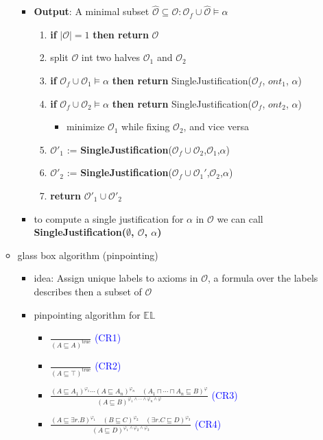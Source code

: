 \documentclass[12pt,a4paper]{article}
\newcommand{\blue}[1]{\textcolor{blue} {#1}}
\newcommand{\ont}{\mathcal{O}}
\newcommand{\sse}{\sqsubseteq}
\newcommand{\sand}{\sqcap}
\begin{document}
\begin{itemize}
\begin{itemize}
\begin{itemize}
\item \textbf{Output}: A minimal subset $\hat{\ont} \subseteq \ont: \ont_f \cup \hat{\ont}\models\alpha$
\begin{enumerate}
\item \textbf{if} $\vert\ont\vert = 1$ \textbf{then return} $\ont$
\item split $\ont$ int two halves $\ont_1$ and $\ont_2$
\item \textbf{if} $\ont_f \cup \ont_1 \models\alpha$ \textbf{then return} SingleJustification($\ont_f$, $ont_1$, $\alpha$)
\item \textbf{if} $\ont_f \cup \ont_2 \models\alpha$ \textbf{then return} SingleJustification($\ont_f$, $ont_2$, $\alpha$)
\begin{itemize}
\item minimize $\ont_1$ while fixing $\ont_2$, and vice versa
\end{itemize}
\item $\ont'_1$ := \textbf{SingleJustification}($\ont_f\cup\ont_2$,$\ont_1$,$\alpha$)
\item $\ont'_2$ := \textbf{SingleJustification}($\ont_f\cup\ont_1'$,$\ont_2$,$\alpha$)
\item \textbf{return} $\ont'_1 \cup \ont'_2$
\end{enumerate}
\item to compute a single justification for $\alpha$ in $\ont$ we can call \textbf{SingleJustification($\emptyset$, $\ont$, $\alpha$)}
\end{itemize}
\item glass box algorithm (pinpointing)
\begin{itemize}
\item idea: Assign unique labels to axioms in $\ont$, a formula over the labels describes then a subset of $\ont$
\item pinpointing algorithm for $\mathbb{EL}$
\begin{itemize}
\item $\displaystyle \frac{}{(A\sse A)^\text{true}}$ \blue{(CR1)}
\item $\displaystyle \frac{}{(A\sse \top)^\text{true}}$ \blue{(CR2)}
\item $\displaystyle \frac{(A\sse A_1)^{\varphi_1} \cdots (A\sse A_n)^{\varphi_n}\quad (A_1\sand\cdots\sand A_n \sse B)^\varphi}{(A\sse B)^{\varphi_1\land\cdots\land\varphi_n\land\varphi}}$ \blue{(CR3)}
\item $\displaystyle \frac{(A\sse \exists r.B)^{\varphi_1} \quad (B\sse C)^{\varphi_2} \quad (\exists r.C \sse D)^{\varphi_3}}{(A\sse D)^{\varphi_1 \land \varphi_2 \land \varphi_3}}$ \blue{(CR4)}
\end{itemize}
\end{itemize}
\end{itemize}
\end{itemize}
\end{document}
